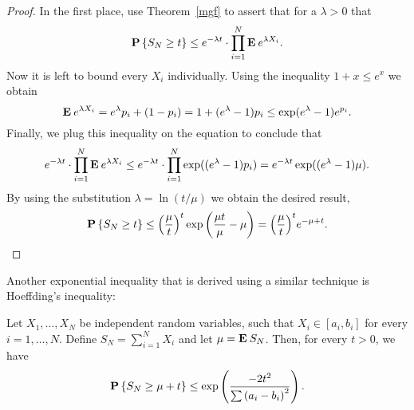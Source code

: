 \begin{proof}
  In the first place, use Theorem~\ref{mgf} to assert that for a $\lambda > 0$ that
  \[\P\left\{  S_N \geq t\right\} \leq e^{-\lambda t}\cdot \prod_{i = 1}^N \E e^{\lambda X_i}.\] 
  Now it is left to bound every $X_i$ individually. Using the inequality $1+x \leq e^x$ we obtain
  \[ \E e^{\lambda X_i} = e^{\lambda}p_i + (1-p_i) = 1 + (e^{\lambda}-1)p_i  \leq \exp(e^{\lambda}-1)e^{p_i}.\]
  Finally, we plug this inequality on the equation to conclude that
  \[e^{-\lambda t}\cdot \prod_{i = 1}^N \E e^{\lambda X_i} \leq e^{-\lambda t}\cdot \prod_{i = 1}^N \exp((e^{\lambda}-1) p_i) = e^{-\lambda t} \exp((e^{\lambda}-1) \mu). \]
  By using the substitution $\lambda = \ln (t/\mu)$ we obtain the desired result,
  \[ \P\left\{  S_N \geq t\right\} \leq {\left(\frac{\mu}{t}\right)}^t \exp{\left(\frac{\mu t}{\mu}-\mu\right)} = {\left(\frac{\mu}{t}\right)}^t e^{-\mu+t}. \]
\end{proof}

Another exponential inequality that is derived using a similar technique is Hoeffding's inequality:

\begin{theorem}\label{hoeffding:bounded}
  Let $X_1, \ldots, X_N$ be independent random variables, such that $X_i \in [a_i,b_i]$ for every $i = 1,\ldots,N$. Define $S_N = \sum_{i = 1}^{N} X_i$ and let $\mu = \E S_N$. Then, for every $t > 0$, we have
  \[ \P\left\{  S_N \geq \mu + t\right\} \leq \exp\left( \frac{-2t^2}{\sum{( a_i - b_i )}^2}\right). \]
\end{theorem}

